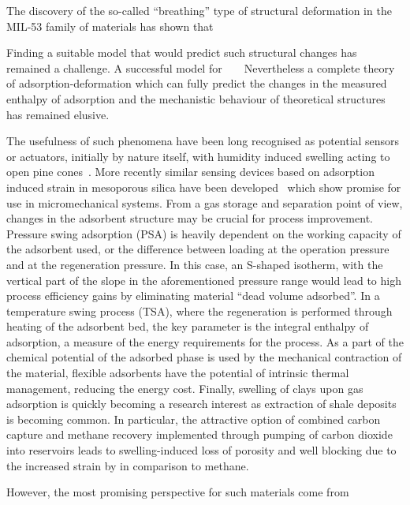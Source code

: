 The discovery of the so-called ``breathing'' type of structural
deformation in the MIL-53 family of materials has shown that 



Finding a suitable model that would predict such structural changes
has remained a challenge. A successful model for 
~\cite{neimarkStressBasedModelBreathing2010}
~\cite{gorAdsorptionInducedDeformationMesoporous2010}
Nevertheless a complete theory of adsorption-deformation 
which can fully predict the changes in the measured enthalpy of 
adsorption and the mechanistic behaviour of theoretical structures
has remained elusive.

The usefulness of such phenomena have been long recognised as potential
sensors or actuators, initially by nature itself, with humidity induced 
swelling acting to open pine cones~\cite{dawsonHowPineCones1997}. 
More recently similar sensing devices based on adsorption induced 
strain in mesoporous silica have been 
developed~\cite{boudotConvertingWaterAdsorption2016, %
ganserCantileverBendingBased2016} which show promise for use 
in micromechanical systems. From a gas storage and separation 
point of view, changes in the adsorbent structure may be crucial 
for process improvement. Pressure swing adsorption (PSA) is heavily 
dependent on the working capacity of the adsorbent used, or the
difference between loading at the operation pressure and at the 
regeneration pressure. In this case, an S-shaped isotherm, with 
the vertical part of the slope in the aforementioned pressure 
range would lead to high process efficiency gains by eliminating material
``dead volume adsorbed''. In a temperature swing process (TSA), where 
the regeneration is performed through heating of the adsorbent 
bed, the key parameter is the integral enthalpy of adsorption, a measure 
of the energy requirements for the process. As a part of the chemical 
potential of the adsorbed phase is used by the mechanical contraction
of the material, flexible adsorbents have the potential of
intrinsic thermal management, reducing the energy cost.
Finally, swelling of clays upon gas adsorption 
is quickly becoming a research interest as extraction of shale 
deposits is becoming common. In particular, the attractive option
of combined carbon capture and methane recovery implemented 
through pumping of carbon dioxide into reservoirs leads to swelling-induced
loss of porosity and well blocking due to the increased strain 
by  in comparison to methane. 

However, the most promising perspective for such materials come from
